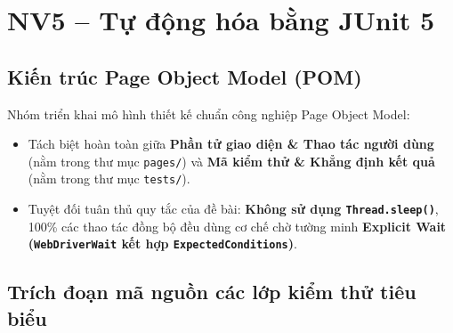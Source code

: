 \documentclass[a4paper]{article}
\begin{document}
\clearpage
\section{NV5 – Tự động hóa bằng JUnit 5}
\subsection{Kiến trúc Page Object Model (POM)}
Nhóm triển khai mô hình thiết kế chuẩn công nghiệp Page Object Model:
\begin{itemize}
  \item Tách biệt hoàn toàn giữa \textbf{Phần tử giao diện \& Thao tác người dùng} (nằm trong thư mục \texttt{pages/}) và \textbf{Mã kiểm thử \& Khẳng định kết quả} (nằm trong thư mục \texttt{tests/}).
  \item Tuyệt đối tuân thủ quy tắc của đề bài: \textbf{Không sử dụng \texttt{Thread.sleep()}}, 100\% các thao tác đồng bộ đều dùng cơ chế chờ tường minh \textbf{Explicit Wait (\texttt{WebDriverWait} kết hợp \texttt{ExpectedConditions})}.
\end{itemize}

\subsection{Trích đoạn mã nguồn các lớp kiểm thử tiêu biểu}
\end{document}

